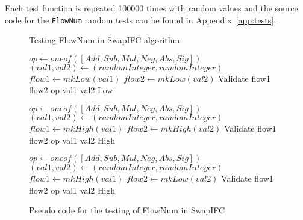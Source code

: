 Each test function is repeated 100000 times with random values and the source code for the {\tt FlowNum} random tests can be found in Appendix~\ref{app:tests}.

\begin{figure}[h]
  \begin{algorithm}[H]
    \caption{Testing FlowNum in SwapIFC algorithm}
    \begin{algorithmic}
      \State $op\gets oneof([Add, Sub, Mul, Neg, Abs, Sig])$
      \State $(val1, val2)\gets (randomInteger, randomInteger)$
      \State $flow1\gets mkLow(val1)$
      \State $flow2\gets mkLow(val2)$
      \State
      \Return Validate flow1 flow2 op val1 val2 Low
      \EndFunction

      \State $op\gets oneof([Add, Sub, Mul, Neg, Abs, Sig])$
      \State $(val1, val2)\gets (randomInteger, randomInteger)$
      \State $flow1\gets mkHigh(val1)$
      \State $flow2\gets mkHigh(val2)$
      \State
      \Return Validate flow1 flow2 op val1 val2 High
      \EndFunction

      \State $op\gets oneof([Add, Sub, Mul, Neg, Abs, Sig])$
      \State $(val1, val2)\gets (randomInteger, randomInteger)$
      \State $flow1\gets mkHigh(val1)$
      \State $flow2\gets mkLow(val2)$
      \State
      \Return Validate flow1 flow2 op val1 val2 High
      \EndFunction
    \end{algorithmic}
  \end{algorithm}
  \caption{Pseudo code for the testing of FlowNum in SwapIFC}
  \label{fig:testing_swapifc}
\end{figure}
